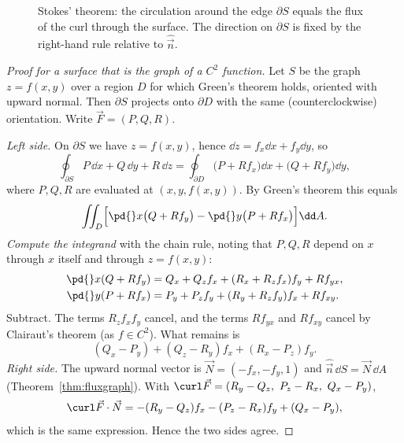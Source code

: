 \begin{figure}[ht]
\centering
{}
\caption{Stokes' theorem: the circulation around the edge $\partial S$ equals the flux of the curl through the surface. The direction on $\partial S$ is fixed by the right-hand rule relative to $\hat{\vec n}$.}
\label{fig:stokes}
\end{figure}

\begin{proof}[Proof for a surface that is the graph of a $C^2$ function]
Let $S$ be the graph $z=f(x,y)$ over a region $D$ for which Green's theorem holds, oriented with upward normal. Then $\partial S$ projects onto $\partial D$ with the same (counterclockwise) orientation. Write $\vec F=(P,Q,R)$.

\emph{Left side.} On $\partial S$ we have $z=f(x,y)$, hence $\dd z=f_x\dd x+f_y\dd y$, so
\[
\oint_{\partial S}P\,\dd x+Q\,\dd y+R\,\dd z=\oint_{\partial D}\bigl(P+Rf_x\bigr)\dd x+\bigl(Q+Rf_y\bigr)\dd y,
\]
where $P,Q,R$ are evaluated at $(x,y,f(x,y))$. By Green's theorem this equals
\[
\iint_D\Bigl[\pd{}x\bigl(Q+Rf_y\bigr)-\pd{}y\bigl(P+Rf_x\bigr)\Bigr]\dd A .
\]
\emph{Compute the integrand} with the chain rule, noting that $P,Q,R$ depend on $x$ through $x$ itself and through $z=f(x,y)$:
\begin{align*}
\pd{}x(Q+Rf_y)&=Q_x+Q_zf_x+(R_x+R_zf_x)f_y+Rf_{yx},\\
\pd{}y(P+Rf_x)&=P_y+P_zf_y+(R_y+R_zf_y)f_x+Rf_{xy}.
\end{align*}
Subtract. The terms $R_zf_xf_y$ cancel, and the terms $Rf_{yx}$ and $Rf_{xy}$ cancel by Clairaut's theorem (as $f\in C^2$). What remains is
\[
(Q_x-P_y)+(Q_z-R_y)f_x+(R_x-P_z)f_y .
\]
\emph{Right side.} The upward normal vector is $\vec N=(-f_x,-f_y,1)$ and $\hat{\vec n}\,\dd S=\vec N\,\dd A$ (Theorem~\ref{thm:fluxgraph}). With $\curl\vec F=(R_y-Q_z,\ P_z-R_x,\ Q_x-P_y)$,
\[
\curl\vec F\cdot\vec N=-(R_y-Q_z)f_x-(P_z-R_x)f_y+(Q_x-P_y),
\]
which is the same expression. Hence the two sides agree.
\end{proof}

